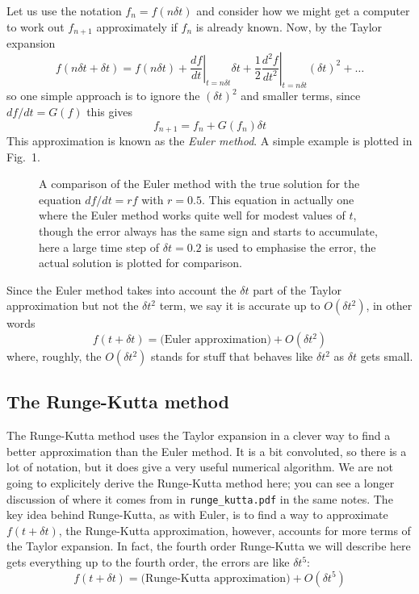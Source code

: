 \documentclass[12pt]{article}
\begin{document}
Let us use the notation $f_n=f(n\delta t)$ and consider how we might
get a computer to work out $f_{n+1}$ approximately if $f_n$ is already
known. Now, by the Taylor expansion
\begin{equation}
f(n\delta t+\delta t)=f(n\delta
t)+\left.\frac{df}{dt}\right|_{t=n\delta t}\delta
t+\frac{1}{2}\left.\frac{d^2f}{dt^2}\right|_{t=n\delta t}(\delta t)^2+\ldots
\end{equation}
so one simple approach is to ignore the $(\delta t)^2$ and smaller terms, since $df/dt=G(f)$ this gives
\begin{equation}
f_{n+1}=f_n+G(f_n)\delta t
\end{equation}
This approximation is known as the \textsl{Euler method}. A simple example is plotted in Fig.~1. 

\begin{figure}
\begin{center}

\end{center}
\caption{A comparison of the Euler method with the true solution for
  the equation $df/dt=rf$ with $r=0.5$. This equation in actually one
  where the Euler method works quite well for modest values of $t$,
  though the error always has the same sign and starts to accumulate,
  here a large time step of $\delta t=0.2$ is used to emphasise the
  error, the actual solution is plotted for comparison.}
\end{figure}

Since the Euler method takes into account the $\delta t$ part of the
Taylor approximation but not the $\delta t^2$ term, we say it is
accurate up to $O(\delta t^2)$, in other words
\begin{equation}
  f(t+\delta t)=\mbox{(Euler approximation)}+O(\delta t^2)
\end{equation}
where, roughly, the $O(\delta t^2)$ stands for stuff that behaves like
$\delta t^2$ as $\delta t$ gets small.


\subsection*{The Runge-Kutta method}

The Runge-Kutta method uses the Taylor expansion in a clever way to
find a better approximation than the Euler method. It is a bit
convoluted, so there is a lot of notation, but it does give a very
useful numerical algorithm. We are not going to explicitely derive the
Runge-Kutta method here; you can see a longer discussion of where it
comes from in \texttt{runge\_kutta.pdf} in the same notes. The key
idea behind Runge-Kutta, as with Euler, is to find a way to
approximate $f(t+\delta t)$, the Runge-Kutta approximation, however,
accounts for more terms of the Taylor expansion. In fact, the fourth
order Runge-Kutta we will describe here gets everything up to the
fourth order, the errors are like $\delta t^5$:
\begin{equation}
  f(t+\delta t)=\mbox{(Runge-Kutta approximation)}+O(\delta t^5)
\end{equation}
\end{document}
